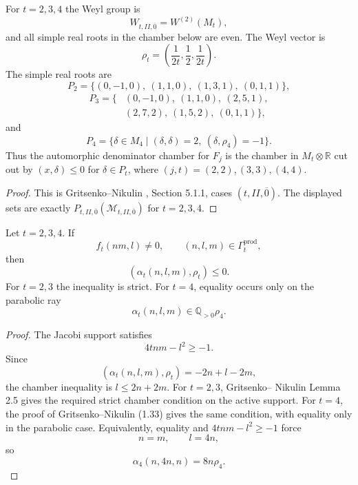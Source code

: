 \documentclass[11pt]{memoir}
\newcommand{\Q}{\mathbb{Q}}
\newcommand{\R}{\mathbb{R}} \newcommand{\La}{\Lambda}
\begin{document}
\begin{proposition}
\label{prop:gn-chambers-234}
For $t=2,3,4$ the Weyl group is
$$W_{t,II,\overline0}=W^{(2)}(M_t),$$
and all simple real roots in the chamber below are even.  The Weyl
vector is
$$\rho_t=\left(\frac{1}{2t},\frac12,\frac{1}{2t}\right).$$
The simple real roots are
$$
P_2=\{(0,-1,0),\ (1,1,0),\ (1,3,1),\ (0,1,1)\},
$$
$$
\begin{aligned}
P_3=\{&(0,-1,0),\ (1,1,0),\ (2,5,1),\\
&(2,7,2),\ (1,5,2),\ (0,1,1)\},
\end{aligned}
$$
and
$$
P_4=\{\delta\in M_4\mid(\delta,\delta)=2,\ (\delta,\rho_4)=-1\}.
$$
Thus the automorphic denominator chamber for $F_j$ is the chamber in
$M_t\otimes\R$ cut out by $(x,\delta)\leq0$ for
$\delta\in P_t$, where $(j,t)=(2,2),(3,3),(4,4)$.
\end{proposition}

\begin{proof}
This is Gritsenko--Nikulin \cite{GNII}, Section 5.1.1, cases
$(t,II,\overline0)$.  The displayed sets are exactly
$P_{t,II,\overline0}(\mathcal M_{t,II,\overline0})$ for
$t=2,3,4$.
\end{proof}

\begin{lemma}
\label{lem:gn-product-chamber-compatibility}
Let \(t=2,3,4\).  If
$$f_t(nm,l)\ne0,\qquad (n,l,m)\in\Gamma_t^{\mathrm{prod}},$$
then
$$
(\alpha_t(n,l,m),\rho_t)\le0.
$$
For \(t=2,3\) the inequality is strict.  For \(t=4\), equality occurs
only on the parabolic ray
$$\alpha_t(n,l,m)\in\Q_{>0}\rho_4.$$
\end{lemma}

\begin{proof}
The Jacobi support satisfies
$$4tnm-l^2\ge -1.$$
Since
$$
(\alpha_t(n,l,m),\rho_t)=-2n+l-2m,
$$
the chamber inequality is \(l\le2n+2m\).  For \(t=2,3\), Gritsenko--
Nikulin Lemma 2.5 gives the required strict chamber condition on the
active support.  For \(t=4\), the proof of Gritsenko--Nikulin (1.33)
gives the same condition, with equality only in the parabolic case.
Equivalently, equality and \(4tnm-l^2\ge -1\) force
$$n=m,\qquad l=4n,$$
so
$$\alpha_4(n,4n,n)=8n\rho_4.$$
\end{proof}
\end{document}
